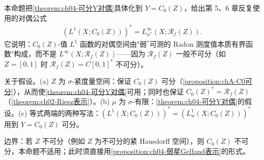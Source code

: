 \documentclass[../../main.tex]{subfiles}%
\begin{document}
\begin{remark}\label{remark:ch04-C0对偶}
本命题把\cref{theorem:ch04-可分Y对偶}具体化到 $Y=C_0(Z)$，给出第 5、6 章反复使用的对偶公式
\begin{align*}
(L^1(X;C_0(Z)))^*=L^\infty_{w^*}(X;\mathscr{R}_f(Z)).
\end{align*}
它说明：$C_0(Z)$-值 $L^1$ 函数的对偶空间由"弱$^*$可测的 Radon 测度值本质有界函数"构成，而不是 $L^\infty(X;\mathscr{R}_f(Z))$——因为 $\mathscr{R}_f(Z)$ 一般不可分（如 $Z=[0,1]$ 时 $\mathscr{R}_f(Z)=C[0,1]^*$ 不可分）。

关于假设。(a) $Z$ 为 $\sigma$-紧度量空间：保证 $C_0(Z)$ 可分（\cref{proposition:chA-C0可分}），从而使\cref{theorem:ch04-可分Y对偶}可用；同时也保证 $C_0(Z)^*=\mathscr{R}_f(Z)$（\cref{theorem:ch02-Riesz表示}）。(b) $\mu$ 为 $\sigma$-有限：\cref{theorem:ch04-可分Y对偶}的假设。(c) 等式两端的两种写法：$(L^1(X;C_0(Z)))^*=(L^1_w(X;C_0(Z)))^*$ 用到 $Y=C_0(Z)$ 可分。

边界：若 $Z$ 不可分（例如 $Z$ 为不可分的紧 Hausdorff 空间），则 $C_0(Z)$ 不可分，本命题不适用；此时须直接用\cref{proposition:ch04-弱星Gelfand表示}的形式。
\end{remark}
\end{document}
